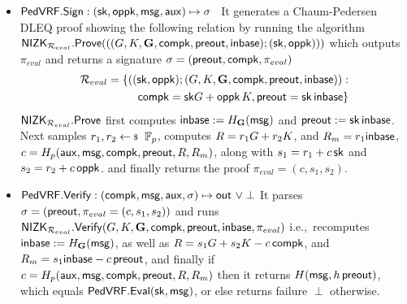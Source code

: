 \begin{itemize}
\item ${\mathsf{PedVRF}}.{\mathsf{Sign}} : (\mathsf{sk},\mathsf{oppk},\mathsf{msg},\mathsf{aux}) \mapsto \sigma$ \,
    It generates a Chaum-Pedersen DLEQ proof  showing the following relation by running the algorithm $ {\mathsf{NIZK}}_{\mathcal{R}_{eval}}.{\mathsf{Prove}}(((G, K,{\mathbf{G}},\mathsf{compk},{\mathsf{preout}},{\mathsf{inbase}}); (\mathsf{sk}, \mathsf{oppk}))) $ which outputs $ \pi_{eval}$ and returns a signature $ \sigma = ({\mathsf{preout}},\mathsf{compk},\pi_{eval}) $
    \begin{align}
    	\mathcal{R}_{eval}= \{((\mathsf{sk}, \mathsf{oppk}); (G, K,{\mathbf{G}},\mathsf{compk},{\mathsf{preout}},{\mathsf{inbase}})): \nonumber\\
    	\mathsf{compk} = \mathsf{sk}G + \mathsf{oppk}\, K, {\mathsf{preout}} = \mathsf{sk} \,{\mathsf{inbase}} \}  \label{rel:commit} 
    \end{align}
    $ {\mathsf{NIZK}}_{\mathcal{R}_{eval}}.{\mathsf{Prove}} $ first computes ${\mathsf{inbase}} := H_{{\mathbf{G}}}(\mathsf{msg})$ and ${\mathsf{preout}} := \mathsf{sk} \, {\mathsf{inbase}}$.
    Next samples $r_1,r_2 \leftsample \F_p$,
    computes $R = r_1 G + r_2 K$, and $R_m = r_1 {\mathsf{inbase}}$,
     $c = H_p(\mathsf{aux},\mathsf{msg},\mathsf{compk},{\mathsf{preout}},R,R_m)$,
     along with $s_1 = r_1 + c \, \mathsf{sk}$ and $s_2 = r_2 + c \, \mathsf{oppk}$.
    and finally returns the proof $\pi_{eval} = (c,s_1,s_2)$.
\item ${\mathsf{PedVRF}}.{\mathsf{Verify}} : (\mathsf{compk},\mathsf{msg},\mathsf{aux},\sigma) \mapsto {\ensuremath{\mathsf{out}}} \,\, \lor \perp$ It 
    parses $\sigma = ({\mathsf{preout}}, \pi_{eval} =(c,s_1,s_2))$ and runs $ {\mathsf{NIZK}}_{\mathcal{R}_{eval}}.{\mathsf{Verify}}(G, K,{\mathbf{G}},\mathsf{compk},{\mathsf{preout}},{\mathsf{inbase}}, \pi_{eval} ) $ i.e.,\, 
    recomputes ${\mathsf{inbase}} := H_{{\mathbf{G}}}(\mathsf{msg})$, as well as
    $R = s_1 G + s_2 K - c \, \mathsf{compk}$, and
    $R_m = s_1 {\mathsf{inbase}} - c \, {\mathsf{preout}}$, and finally
    if $c = H_p(\mathsf{aux},\mathsf{msg},\mathsf{compk},{\mathsf{preout}},R,R_m)$ then it returns $H(\mathsf{msg}, h \, {\mathsf{preout}})$, which equals ${\mathsf{PedVRF}}.{\mathsf{Eval}}(\mathsf{sk},\mathsf{msg})$,
         or else returns failure $\perp$ otherwise.
\end{itemize}

